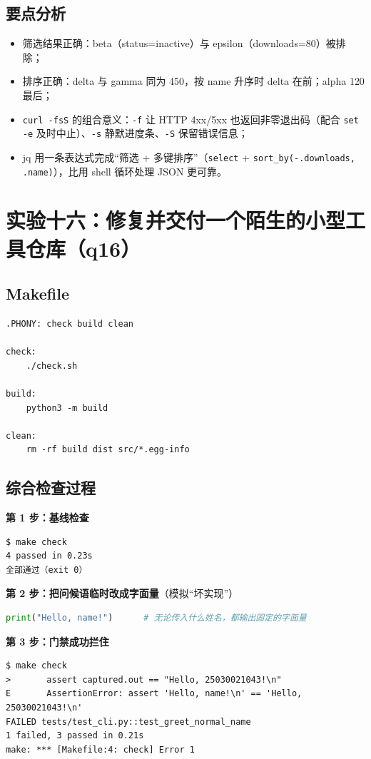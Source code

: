 \documentclass[UTF8,fontset=ubuntu]{ctexart}
\begin{document}
\subsection{要点分析}
\begin{itemize}
\item 筛选结果正确：beta（status=inactive）与 epsilon（downloads=80）被排除；
\item 排序正确：delta 与 gamma 同为 450，按 name 升序时 delta 在前；alpha 120 最后；
\item \lstinline|curl -fsS| 的组合意义：\lstinline|-f| 让 HTTP 4xx/5xx 也返回非零退出码（配合 \lstinline|set -e| 及时中止）、\lstinline|-s| 静默进度条、\lstinline|-S| 保留错误信息；
\item jq 用一条表达式完成“筛选 + 多键排序”（\lstinline|select| + \lstinline|sort_by(-.downloads, .name)|），比用 shell 循环处理 JSON 更可靠。
\end{itemize}

\section{实验十六：修复并交付一个陌生的小型工具仓库（q16）}

\subsection{Makefile}
\begin{lstlisting}
.PHONY: check build clean

check:
	./check.sh

build:
	python3 -m build

clean:
	rm -rf build dist src/*.egg-info
\end{lstlisting}

\subsection{综合检查过程}
\textbf{第 1 步：基线检查}
\begin{lstlisting}
$ make check
4 passed in 0.23s
全部通过（exit 0）
\end{lstlisting}

\textbf{第 2 步：把问候语临时改成字面量}（模拟“坏实现”）
\begin{lstlisting}[language=Python]
    print("Hello, name!")      # 无论传入什么姓名，都输出固定的字面量
\end{lstlisting}

\textbf{第 3 步：门禁成功拦住}
\begin{lstlisting}
$ make check
>       assert captured.out == "Hello, 25030021043!\n"
E       AssertionError: assert 'Hello, name!\n' == 'Hello, 25030021043!\n'
FAILED tests/test_cli.py::test_greet_normal_name
1 failed, 3 passed in 0.21s
make: *** [Makefile:4: check] Error 1
\end{lstlisting}
\end{document}
